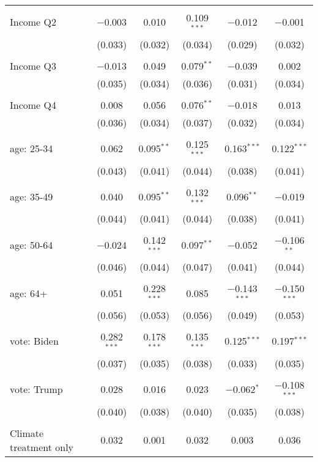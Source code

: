 \begin{tabular}{@{\extracolsep{5pt}}lccccc}
  & & & & & \\ 
 Income Q2 & $-$0.003 & 0.010 & 0.109$^{***}$ & $-$0.012 & $-$0.001 \\ 
  & (0.033) & (0.032) & (0.034) & (0.029) & (0.032) \\ 
  & & & & & \\ 
 Income Q3 & $-$0.013 & 0.049 & 0.079$^{**}$ & $-$0.039 & 0.002 \\ 
  & (0.035) & (0.034) & (0.036) & (0.031) & (0.034) \\ 
  & & & & & \\ 
 Income Q4 & 0.008 & 0.056 & 0.076$^{**}$ & $-$0.018 & 0.013 \\ 
  & (0.036) & (0.034) & (0.037) & (0.032) & (0.034) \\ 
  & & & & & \\ 
 age: 25-34 & 0.062 & 0.095$^{**}$ & 0.125$^{***}$ & 0.163$^{***}$ & 0.122$^{***}$ \\ 
  & (0.043) & (0.041) & (0.044) & (0.038) & (0.041) \\ 
  & & & & & \\ 
 age: 35-49 & 0.040 & 0.095$^{**}$ & 0.132$^{***}$ & 0.096$^{**}$ & $-$0.019 \\ 
  & (0.044) & (0.041) & (0.044) & (0.038) & (0.041) \\ 
  & & & & & \\ 
 age: 50-64 & $-$0.024 & 0.142$^{***}$ & 0.097$^{**}$ & $-$0.052 & $-$0.106$^{**}$ \\ 
  & (0.046) & (0.044) & (0.047) & (0.041) & (0.044) \\ 
  & & & & & \\ 
 age: 64+ & 0.051 & 0.228$^{***}$ & 0.085 & $-$0.143$^{***}$ & $-$0.150$^{***}$ \\ 
  & (0.056) & (0.053) & (0.056) & (0.049) & (0.053) \\ 
  & & & & & \\ 
 vote: Biden & 0.282$^{***}$ & 0.178$^{***}$ & 0.135$^{***}$ & 0.125$^{***}$ & 0.197$^{***}$ \\ 
  & (0.037) & (0.035) & (0.038) & (0.033) & (0.035) \\ 
  & & & & & \\ 
 vote: Trump & 0.028 & 0.016 & 0.023 & $-$0.062$^{*}$ & $-$0.108$^{***}$ \\ 
  & (0.040) & (0.038) & (0.040) & (0.035) & (0.038) \\ 
  & & & & & \\ 
 Climate treatment only & 0.032 & 0.001 & 0.032 & 0.003 & 0.036 \\ 

\end{tabular}
